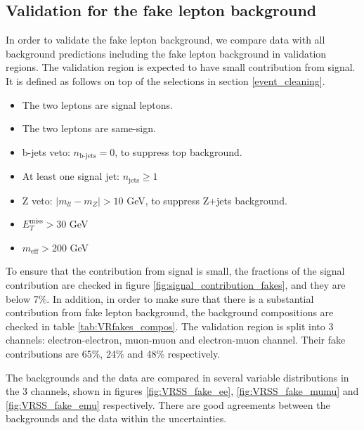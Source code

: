 \subsection{Validation for the fake lepton background}
In order to validate the fake lepton background, we compare data with all background predictions including the fake lepton background in validation regions.
The validation region is expected to have small contribution from signal.
It is defined as follows on top of the selections in section \ref{event_cleaning}.
\begin{itemize}
\item The two leptons are signal leptons.
\item The two leptons are same-sign.
\item b-jets veto: $n_{\text{b-jets}} = 0$, to suppress top background.
\item At least one signal jet: $n_{\text{jets}} \geq 1$
\item Z veto: $|m_{ll} - m_Z| > 10$ GeV, to suppress Z+jets background.
\item $E_{T}^{\text{miss}} > 30$ GeV
\item $m_{\text{eff}} > 200$ GeV
\end{itemize}

To ensure that the contribution from signal is small, the fractions of the signal contribution are checked in figure \ref{fig:signal_contribution_fakes}, and they are below 7\%.
In addition, in order to make sure that there is a substantial contribution from fake lepton background, the background compositions are checked in table \ref{tab:VRfakes_compos}.
The validation region is split into 3 channels: electron-electron, muon-muon and electron-muon channel.
Their fake contributions are 65\%,  24\% and 48\% respectively.

The backgrounds and the data are compared in several variable distributions in the 3 channels, shown in figures \ref{fig:VRSS_fake_ee}, \ref{fig:VRSS_fake_mumu} and \ref{fig:VRSS_fake_emu} respectively.
There are good agreements between the backgrounds and the data within the uncertainties.

